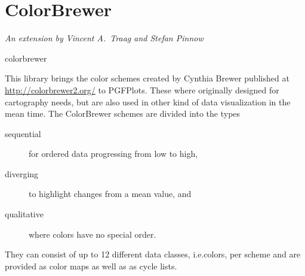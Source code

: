 {{%
}}

\section{ColorBrewer}
\def\pgfplotsmanualcurlibrary{colormaps}

{\emph{An extension by Vincent A.\ Traag and Stefan Pinnow}}

\begin{pgfplotslibrary}{colorbrewer}

This library brings the color schemes created by Cynthia Brewer published at
\url{http://colorbrewer2.org/} to PGFPlots. These where originally designed for
cartography needs, but are also used in other kind of data visualization in the
mean time. The ColorBrewer schemes are divided into the types
%
\begin{description}
    \item[sequential] for ordered data progressing from low to high,
    \item[diverging] to highlight changes from a mean value, and
    \item[qualitative] where colors have no special order.
\end{description}
%
They can consist of up to 12 different data classes, i.e.\@ colors, per scheme
and are provided as color maps as well as as cycle lists.

{%
\centering

}
\end{pgfplotslibrary}
